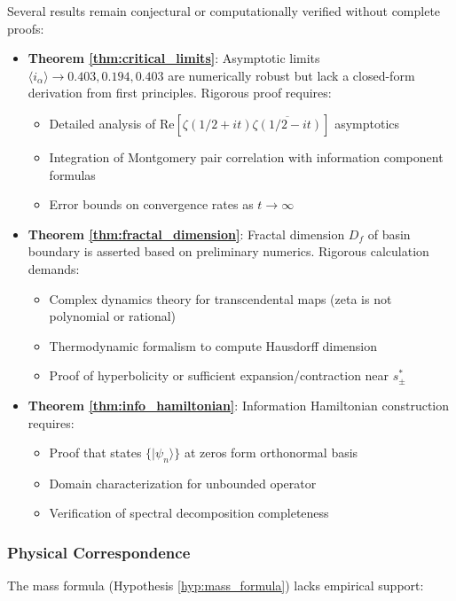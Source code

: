 \documentclass[12pt]{article}
\theoremstyle{plain}
\theoremstyle{definition}
\begin{document}
Several results remain conjectural or computationally verified without complete proofs:

\begin{itemize}
\item \textbf{Theorem \ref{thm:critical_limits}}: Asymptotic limits $\langle i_\alpha \rangle \to 0.403, 0.194, 0.403$ are numerically robust but lack a closed-form derivation from first principles. Rigorous proof requires:
  \begin{itemize}
  \item Detailed analysis of $\text{Re}[\zeta(1/2+it)\overline{\zeta(1/2-it)}]$ asymptotics
  \item Integration of Montgomery pair correlation with information component formulas
  \item Error bounds on convergence rates as $t \to \infty$
  \end{itemize}

\item \textbf{Theorem \ref{thm:fractal_dimension}}: Fractal dimension $D_f$ of basin boundary is asserted based on preliminary numerics. Rigorous calculation demands:
  \begin{itemize}
  \item Complex dynamics theory for transcendental maps (zeta is not polynomial or rational)
  \item Thermodynamic formalism to compute Hausdorff dimension
  \item Proof of hyperbolicity or sufficient expansion/contraction near $s_\pm^*$
  \end{itemize}

\item \textbf{Theorem \ref{thm:info_hamiltonian}}: Information Hamiltonian construction requires:
  \begin{itemize}
  \item Proof that states $\{|\psi_n\rangle\}$ at zeros form orthonormal basis
  \item Domain characterization for unbounded operator
  \item Verification of spectral decomposition completeness
  \end{itemize}
\end{itemize}

\subsubsection{Physical Correspondence}

The mass formula (Hypothesis \ref{hyp:mass_formula}) lacks empirical support:
\end{document}
